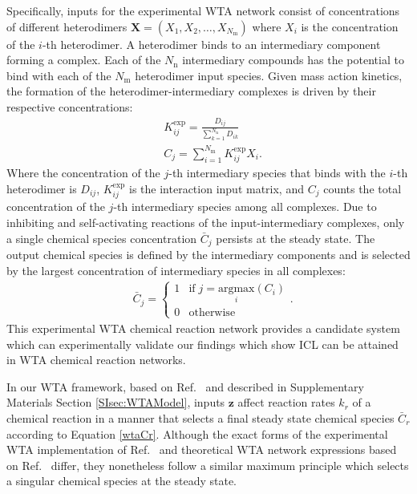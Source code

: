 \documentclass[%
reprint,
superscriptaddress,
amsmath,amssymb,
aps,
]{revtex4-2}
\begin{document}
\begin{onecolumngrid}
		Specifically, inputs for the experimental WTA network consist of concentrations of different heterodimers $\mathbf{X} = (X_1,X_2,\dots,X_{N_\text{m}})$ where $X_i$ is the concentration of the $i$-th heterodimer. A heterodimer binds to an intermediary component forming a complex. Each of the $N_\text{n}$ intermediary compounds has the potential to bind with each of the $N_\text{m}$ heterodimer input species. Given mass action kinetics, the formation of the heterodimer-intermediary complexes is driven by their respective concentrations: 
		\begin{align}
			&K^{\text{exp}}_{ij} = \frac{D_{ij}}{\sum_{k=1}^{N_\text{n}} D_{ik}}\\
			&C_j = \sum_{i=1}^{N_\text{m}} K^{\text{exp}}_{ij}X_i. 
		\end{align}
		Where the concentration of the $j$-th intermediary species that binds with the $i$-th heterodimer is $D_{ij}$, $K^{\text{exp}}_{ij}$ is the interaction input matrix, and $C_j$ counts the total concentration of the $j$-th intermediary species among all complexes.
		Due to inhibiting and self-activating reactions of the input-intermediary complexes, only a single chemical species concentration $\bar{C}_j$ persists at the steady state. The output chemical species is defined by the intermediary components and is selected by the largest concentration of intermediary species in all complexes:
		\begin{align}
			&\bar{C}_j = 
			\begin{cases}
				1 & \text{if} \;j = \underset{i}{\text{argmax}}\left( C_i \right)   \\
				0 & \text{otherwise}
			\end{cases}. 
		\end{align}
		This experimental WTA chemical reaction network provides a candidate system which can  experimentally validate our findings which show ICL can be attained in WTA chemical reaction networks. 
		
		In our WTA framework, based on Ref.~ and described in Supplementary Materials Section \ref{SIsec:WTAModel}, inputs $\mathbf{z}$ affect reaction rates $k_r$ of a chemical reaction in a manner that selects a final steady state chemical species $\bar{C}_r$ according to Equation \ref{wtaCr}. 
		Although the exact forms of the experimental WTA implementation of Ref.~ and theoretical WTA network expressions based on Ref.~ differ, they nonetheless follow a similar maximum principle which selects a singular chemical species at the steady state. 
		

\end{onecolumngrid}
\end{document}
